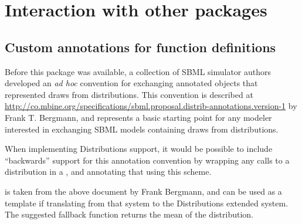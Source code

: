 \documentclass[draftspec]{sbmlpkgspec}
\newcommand{\Math}{\textbf{\class{Math}}\xspace}
\newcommand{\distrib}{Distributions\xspace}
\begin{document}
\clearpage
\section{Interaction with other packages}

\subsection{Custom annotations for function definitions}
\label{sec:annotation-scheme}
Before this package was available, a collection of SBML simulator authors developed an \emph{ad hoc} convention for exchanging annotated \FunctionDefinition objects that represented draws from distributions.  This convention is described at \url{http://co.mbine.org/specifications/sbml.proposal.distrib-annotations.version-1} by Frank T. Bergmann, and represents a basic starting point for any modeler interested in exchanging SBML models containing draws from distributions.

When implementing \distrib support, it would be possible to include ``backwards'' support for this annotation convention by wrapping any calls to a distribution in a \FunctionDefinition, and annotating that using this scheme.

 is taken from the above document by Frank Bergmann, and can be used as a template if translating from that \FunctionDefinition system to the \distrib extended \Math system.  The suggested fallback function returns the mean of the distribution.

\newcommand{\tighturl}[1]{\textls[-40]{\url{#1}}}
\end{document}
